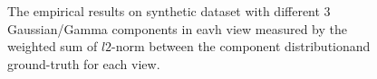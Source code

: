 \documentclass[11pt]{article}
\begin{document}
\begin{figure}
\caption{The empirical results on synthetic dataset with different 3 Gaussian/Gamma components in eavh view measured by the weighted sum of $l2$-norm between the component distributionand ground-truth for each view.}
\end{figure}
\end{document}
